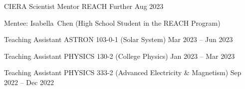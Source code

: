 


\begin{cventries}

\cvsimpentry
{CIERA Scientist Mentor}
{REACH Further}
{Aug 2023}
{
\begin{cvitems}
	\item {Mentee: Isabella~Chen (High School Student in the REACH Program)}
\end{cvitems}
}

\cvsimpentry
{Teaching Assistant}
{ASTRON 103-0-1 (Solar System)}
{Mar 2023 -- Jun 2023}
{}

\cvsimpentry
{Teaching Assistant}
{PHYSICS 130-2 (College Physics)}
{Jan 2023 -- Mar 2023}
{}

\cvsimpentry
{Teaching Assistant}
{PHYSICS 333-2 (Advanced Electricity \& Magnetism)}
{Sep 2022 -- Dec 2022}
{}


\end{cventries}